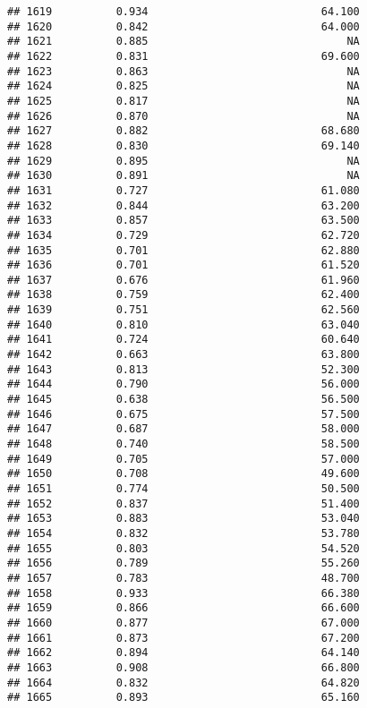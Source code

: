 \documentclass[
]{article}
\begin{document}
\begin{verbatim}
## 1619          0.934                           64.100
## 1620          0.842                           64.000
## 1621          0.885                               NA
## 1622          0.831                           69.600
## 1623          0.863                               NA
## 1624          0.825                               NA
## 1625          0.817                               NA
## 1626          0.870                               NA
## 1627          0.882                           68.680
## 1628          0.830                           69.140
## 1629          0.895                               NA
## 1630          0.891                               NA
## 1631          0.727                           61.080
## 1632          0.844                           63.200
## 1633          0.857                           63.500
## 1634          0.729                           62.720
## 1635          0.701                           62.880
## 1636          0.701                           61.520
## 1637          0.676                           61.960
## 1638          0.759                           62.400
## 1639          0.751                           62.560
## 1640          0.810                           63.040
## 1641          0.724                           60.640
## 1642          0.663                           63.800
## 1643          0.813                           52.300
## 1644          0.790                           56.000
## 1645          0.638                           56.500
## 1646          0.675                           57.500
## 1647          0.687                           58.000
## 1648          0.740                           58.500
## 1649          0.705                           57.000
## 1650          0.708                           49.600
## 1651          0.774                           50.500
## 1652          0.837                           51.400
## 1653          0.883                           53.040
## 1654          0.832                           53.780
## 1655          0.803                           54.520
## 1656          0.789                           55.260
## 1657          0.783                           48.700
## 1658          0.933                           66.380
## 1659          0.866                           66.600
## 1660          0.877                           67.000
## 1661          0.873                           67.200
## 1662          0.894                           64.140
## 1663          0.908                           66.800
## 1664          0.832                           64.820
## 1665          0.893                           65.160

\end{verbatim}
\end{document}
